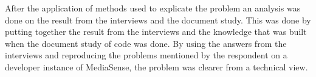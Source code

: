 After the application of methods used to explicate the problem an analysis was done on the result from the interviews and the document study. This was done by putting together the result from the interviews and the knowledge that was built when the document study of code was done. By using the answers from the interviews and reproducing the problems mentioned by the respondent on a developer instance of MediaSense, the problem was clearer from a technical view.
